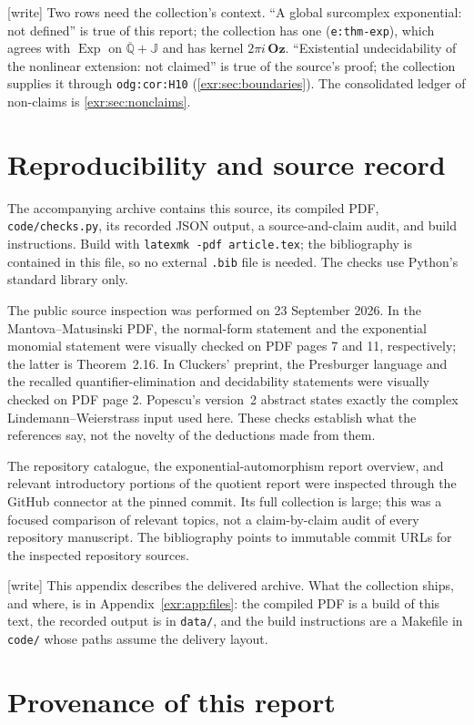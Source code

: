 \documentclass[11pt,letterpaper]{article}
\numberwithin{equation}{section}
\theoremstyle{definition}
\theoremstyle{remark}
\newcommand{\Oz}{\mathbf{Oz}}
\newcommand{\Qb}{\overline{\mathbb Q}}
\newcommand{\J}{\mathbb J}
\newcommand{\Exp}{\operatorname{Exp}}
\newcommand{\rpath}[1]{\nolinkurl{#1}}%
\newcommand{\lbl}[1]{\nolinkurl{#1}}%
\newcommand{\wtag}{\textup{[write]}}%
\begin{document}
\wtag{} Two rows need the collection's context. ``A global surcomplex
exponential: not defined'' is true of this report; the collection has one
(\lbl{e:thm-exp}), which agrees with $\Exp$ on $\Qb+\J$ and has kernel
$2\pi i\,\Oz$. ``Existential undecidability of the nonlinear extension: not
claimed'' is true of the source's proof; the collection supplies it through
\lbl{odg:cor:H10} (\cref{exr:sec:boundaries}). The consolidated ledger of
non-claims is \cref{exr:sec:nonclaims}.

\section{Reproducibility and source record}\label{exr:app:sources}
The accompanying archive contains this source, its compiled PDF,
\texttt{code/checks.py}, its recorded JSON output, a source-and-claim audit, and
build instructions. Build with \texttt{latexmk -pdf article.tex}; the bibliography
is contained in this file, so no external \texttt{.bib} file is needed. The checks
use Python's standard library only.

The public source inspection was performed on 23 September 2026. In the
Mantova--Matusinski PDF, the normal-form statement and the exponential monomial
statement were visually checked on PDF pages 7 and 11, respectively; the latter is
Theorem~2.16. In Cluckers' preprint, the Presburger language and the recalled
quantifier-elimination and decidability statements were visually checked on PDF
page 2. Popescu's version~2 abstract states exactly the complex
Lindemann--Weierstrass input used here. These checks establish what the references
say, not the novelty of the deductions made from them.

The repository catalogue, the exponential-automorphism report overview, and
relevant introductory portions of the quotient report were inspected through
the GitHub connector at the pinned commit. Its full collection is large; this was a focused
comparison of relevant topics, not a claim-by-claim audit of every repository
manuscript. The bibliography points to immutable commit URLs for the inspected
repository sources.

\wtag{} This appendix describes the delivered archive. What the collection
ships, and where, is in Appendix~\ref{exr:app:files}: the compiled PDF is a
build of this text, the recorded output is in \rpath{data/}, and the build
instructions are a Makefile in \rpath{code/} whose paths assume the delivery
layout.

\section{Provenance of this report}\label{exr:app:report}
\end{document}
